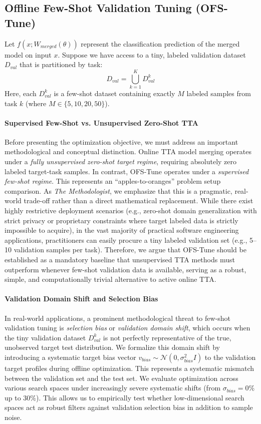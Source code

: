 \subsection{Offline Few-Shot Validation Tuning (OFS-Tune)}
Let $f(x; W_{merged}(\theta))$ represent the classification prediction of the merged model on input $x$. Suppose we have access to a tiny, labeled validation dataset $D_{val}$ that is partitioned by task:
\begin{equation}
D_{val} = \bigcup_{k=1}^K D_{val}^k
\end{equation}
Here, each $D_{val}^k$ is a few-shot dataset containing exactly $M$ labeled samples from task $k$ (where $M \in \{5, 10, 20, 50\}$).

\paragraph{Supervised Few-Shot vs. Unsupervised Zero-Shot TTA}
Before presenting the optimization objective, we must address an important methodological and conceptual distinction. Online TTA model merging operates under a \emph{fully unsupervised zero-shot target regime}, requiring absolutely zero labeled target-task samples. In contrast, OFS-Tune operates under a \emph{supervised few-shot regime}. This represents an ``apples-to-oranges'' problem setup comparison.
As \emph{The Methodologist}, we emphasize that this is a pragmatic, real-world trade-off rather than a direct mathematical replacement. While there exist highly restrictive deployment scenarios (e.g., zero-shot domain generalization with strict privacy or proprietary constraints where target labeled data is strictly impossible to acquire), in the vast majority of practical software engineering applications, practitioners can easily procure a tiny labeled validation set (e.g., 5--10 validation samples per task).
Therefore, we argue that OFS-Tune should be established as a mandatory baseline that unsupervised TTA methods must outperform whenever few-shot validation data is available, serving as a robust, simple, and computationally trivial alternative to active online TTA.

\paragraph{Validation Domain Shift and Selection Bias}
In real-world applications, a prominent methodological threat to few-shot validation tuning is \emph{selection bias} or \emph{validation domain shift}, which occurs when the tiny validation dataset $D_{val}^k$ is not perfectly representative of the true, unobserved target test distribution. We formalize this domain shift by introducing a systematic target bias vector $v_{bias} \sim \mathcal{N}(0, \sigma^2_{bias} I)$ to the validation target profiles during offline optimization. This represents a systematic mismatch between the validation set and the test set. We evaluate optimization across various search spaces under increasingly severe systematic shifts (from $\sigma_{bias} = 0\%$ up to $30\%$). This allows us to empirically test whether low-dimensional search spaces act as robust filters against validation selection bias in addition to sample noise.


